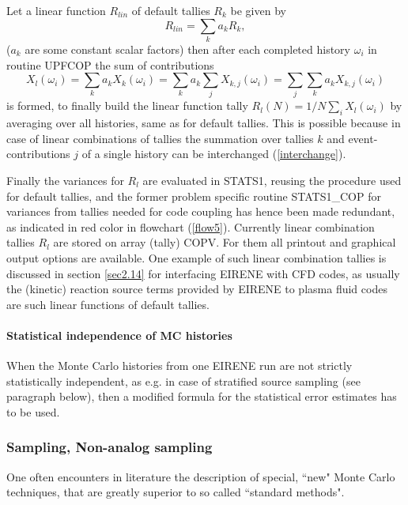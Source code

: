 Let a linear function $R_{lin}$  of default tallies $R_k$ be given by
\begin{equation}
R_{lin} = \sum_k a_k R_k,
\end{equation}
($a_k$ are some constant scalar factors)
then after each completed history $\omega_i$ in routine UPFCOP the sum
of contributions
\begin{equation}\label{interchange}
X_l(\omega_i)= \sum_k a_k X_k(\omega_i) = \sum_k a_k \sum_j X_{k,j}(\omega_i) = \sum_j \sum_k a_k X_{k,j}(\omega_i)
\end{equation}
is formed, to finally build the linear function tally $R_l(N)=1/N\sum_i X_l(\omega_i)$ by averaging over all histories, same as for default tallies.
This is possible because in case of linear combinations of tallies the summation over tallies $k$ and event-contributions $j$ of a single
history can be interchanged (\ref{interchange}).


Finally the variances for $R_l$ are evaluated in STATS1, reusing the procedure used for default tallies, and the
former problem specific routine STATS1\_COP for variances from tallies needed for code coupling has hence been made redundant, as indicated in red color in flowchart (\ref{flow5}).
Currently linear combination tallies $R_l$ are stored
on array (tally) COPV. For them all printout and graphical output options are available.
One example of such linear combination tallies is discussed in section \ref{sec2.14} for interfacing EIRENE with
CFD codes, as usually the (kinetic) reaction source terms provided by EIRENE to plasma fluid codes are such linear functions
of default tallies.

\paragraph{Statistical independence of MC histories}

When the Monte Carlo histories from one EIRENE run are not strictly statistically independent,
as e.g. in case of stratified source sampling (see paragraph below), then a modified
formula for the statistical error estimates has to be used.

\subsubsection{Sampling, Non-analog sampling}
\label{sec1.2.1a}

One often encounters in literature the description of special,
``new" Monte Carlo techniques, that are greatly superior to so
called ``standard methods".

